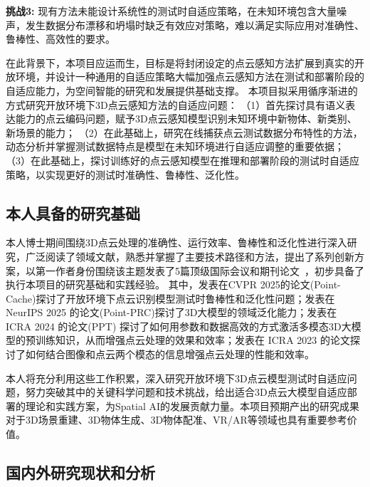 \documentclass[12pt]{article}
\newcommand{\myEmph}[1]{\textbf{\textcolor[rgb]{0,0,0.25}{#1}}}
\begin{document}
\myEmph{挑战3:} 现有方法未能设计系统性的测试时自适应策略，在未知环境包含大量噪声，发生数据分布漂移和坍塌时缺乏有效应对策略，难以满足实际应用对准确性、鲁棒性、高效性的要求。


在此背景下，本项目应运而生，目标是将封闭设定的点云感知方法扩展到真实的开放环境，并设计一种通用的自适应策略大幅加强点云感知方法在测试和部署阶段的自适应能力，为空间智能的研究和发展提供基础支撑。
本项目拟采用循序渐进的方式研究开放环境下3D点云感知方法的自适应问题：
（1）首先探讨具有语义表达能力的点云编码问题，赋予3D点云感知模型识别未知环境中新物体、新类别、新场景的能力；
（2）在此基础上，研究在线捕获点云测试数据分布特性的方法，动态分析并掌握测试数据特点是模型在未知环境进行自适应调整的重要依据；
（3）在此基础上，探讨训练好的点云感知模型在推理和部署阶段的测试时自适应策略，以实现更好的测试时准确性、鲁棒性、泛化性。

\subsection{本人具备的研究基础}

本人博士期间围绕3D点云处理的准确性、运行效率、鲁棒性和泛化性进行深入研究，广泛阅读了领域文献，熟悉并掌握了主要技术路径和方法，提出了系列创新方案，以第一作者身份围绕该主题发表了5篇顶级国际会议和期刊论文~\cite{sun25pointcache,sun24point-prc,sun25vsformer,sun24ppt3d,sun23vipformer}，初步具备了执行本项目的研究基础和实践经验。
其中，发表在CVPR 2025的论文(Point-Cache)探讨了开放环境下点云识别模型测试时鲁棒性和泛化性问题；发表在 NeurIPS 2025 的论文(Point-PRC)探讨了3D大模型的领域泛化能力；发表在 ICRA 2024 的论文(PPT) 探讨了如何用参数和数据高效的方式激活多模态3D大模型的预训练知识，从而增强点云处理的效果和效率；发表在 ICRA 2023 的论文探讨了如何结合图像和点云两个模态的信息增强点云处理的性能和效率。

本人将充分利用这些工作积累，深入研究开放环境下3D点云模型测试时自适应问题，努力突破其中的关键科学问题和技术挑战，给出适合3D点云大模型自适应部署的理论和实践方案，为Spatial AI的发展贡献力量。本项目预期产出的研究成果对于3D场景重建、3D物体生成、3D物体配准、VR/AR等领域也具有重要参考价值。

\subsection{国内外研究现状和分析}
\end{document}
